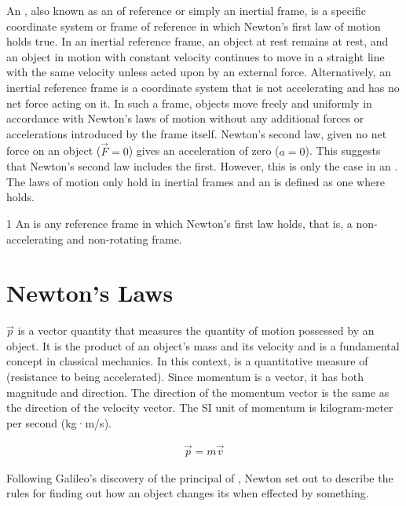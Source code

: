 An , also known as an  of reference or simply an inertial frame, is a specific coordinate system or frame of reference in which Newton's first law of motion holds true. In an inertial reference frame, an object at rest remains at rest, and an object in motion with constant velocity continues to move in a straight line with the same velocity unless acted upon by an external force. Alternatively, an inertial reference frame is a coordinate system that is not accelerating and has no net force acting on it. In such a frame, objects move freely and uniformly in accordance with Newton's laws of motion without any additional forces or accelerations introduced by the frame itself. Newton's second law, given no net force on an object ($\vec{F}=0$) gives an acceleration of zero ($a=0$). This suggests that Newton's second law includes the first. However, this is only the case in an . The laws of motion only hold in inertial frames and an  is defined as one where  holds.

\begin{defn}{1}
An  is any reference frame in which Newton's first law holds, that is, a non-accelerating and non-rotating frame.
\end{defn}



\section{Newton's Laws}

 $\vec{p}$ is a vector quantity that measures the quantity of motion possessed by an object. It is the product of an object's mass and its velocity and is a fundamental concept in classical mechanics. In this context,  is a quantitative measure of  (resistance to being accelerated). Since momentum is a vector, it has both magnitude and direction. The direction of the momentum vector is the same as the direction of the velocity vector. The SI unit of momentum is kilogram-meter per second (kg·m/s).

\begin{align}
	\vec{p} = m\vec{v}
\end{align}

Following Galileo's discovery of the principal of , Newton set out to describe the rules for finding out how an object changes its  when effected by something.

